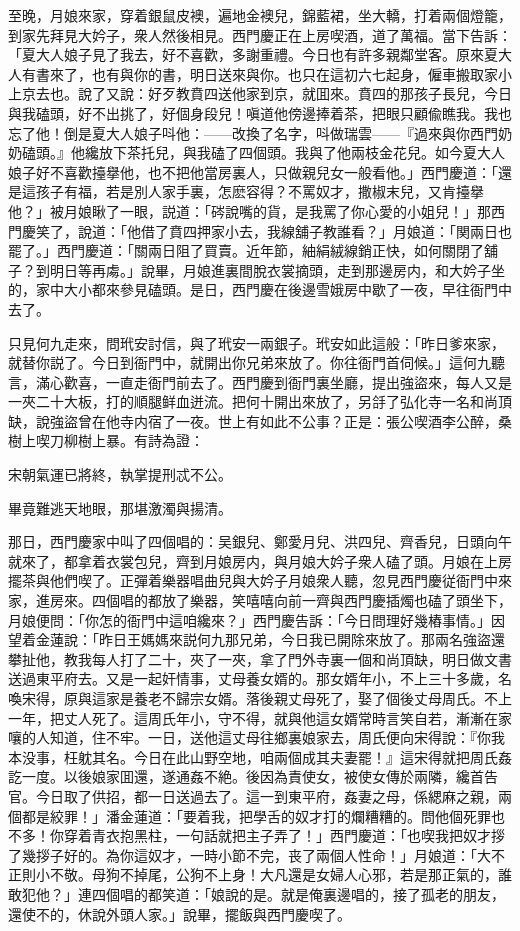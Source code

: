 至晚，月娘來家，穿着銀鼠皮襖，遍地金襖兒，錦藍裙，坐大轎，打着兩個燈籠，到家先拜見大妗子，衆人然後相見。西門慶正在上房喫酒，道了萬福。當下告訴：「夏大人娘子見了我去，好不喜歡，多謝重禮。今日也有許多親鄰堂客。原來夏大人有書來了，也有與你的書，明日送來與你。也只在這初六七起身，僱車搬取家小上京去也。說了又說：好歹教賁四送他家到京，就囬來。賁四的那孩子長兒，今日與我磕頭，好不出挑了，好個身段兒！嗔道他傍邊捧着茶，把眼只顧偸瞧我。我也忘了他！倒是夏大人娘子呌他：——改換了名字，呌做瑞雲——『過來與你西門奶奶磕頭。』他纔放下茶托兒，與我磕了四個頭。我與了他兩枝金花兒。如今夏大人娘子好不喜歡擡擧他，也不把他當房裏人，只做親兒女一般看他。」西門慶道：「還是這孩子有福，若是別人家手裏，怎麽容得？不罵奴才，撒椒末兒，又肯擡擧他？」被月娘瞅了一眼，説道：「硶說嘴的貨，是我罵了你心愛的小姐兒！」那西門慶笑了，說道：「他借了賁四押家小去，我線舖子教誰看？」月娘道：「関兩日也罷了。」西門慶道：「關兩日阻了買賣。近年節，紬絹絨線銷正快，如何關閉了舖子？到明日等再䖏。」說畢，月娘進裏間脫衣裳摘頭，走到那邊房内，和大妗子坐的，家中大小都來參見磕頭。是日，西門慶在後邊雪娥房中歇了一夜，早往衙門中去了。

只見何九走來，問玳安討信，與了玳安一兩銀子。玳安如此這般：「昨日爹來家，就替你説了。今日到衙門中，就開出你兄弟來放了。你往衙門首伺候。」這何九聽言，滿心歡喜，一直走衙門前去了。西門慶到衙門裏坐廳，提出強盜來，每人又是一夾二十大板，打的順腿鲜血迸流。把何十開出來放了，另㧱了弘化寺一名和尚頂缺，說強盜曾在他寺内宿了一夜。世上有如此不公事？正是：張公喫酒李公醉，桑樹上喫刀柳樹上暴。有詩為證：

\begin{myquote}
宋朝氣運已將終，執掌提刑忒不公。

畢竟難逃天地眼，那堪激濁與揚清。
\end{myquote}

那日，西門慶家中叫了四個唱的：吴銀兒、鄭愛月兒、洪四兒、齊香兒，日頭向午就來了，都拿着衣裳包兒，齊到月娘房内，與月娘大妗子衆人磕了頭。月娘在上房擺茶與他們喫了。正彈着樂器唱曲兒與大妗子月娘衆人聽，忽見西門慶従衙門中來家，進房來。四個唱的都放了樂器，笑嘻嘻向前一齊與西門慶插燭也磕了頭坐下，月娘便問：「你怎的衙門中這咱纔來？」西門慶告訴：「今日問理好幾樁事情。」因望着金蓮說：「昨日王媽媽來説何九那兄弟，今日我已開除來放了。那兩名強盜還攀扯他，教我每人打了二十，夾了一夾，拿了門外寺裏一個和尚頂缺，明日做文書送過東平府去。又是一起奸情事，丈母養女婿的。那女婿年小，不上三十多歲，名喚宋得，原與這家是養老不歸宗女婿。落後親丈母死了，娶了個後丈母周氏。不上一年，把丈人死了。這周氏年小，守不得，就與他這女婿常時言笑自若，漸漸在家嚷的人知道，住不牢。一日，送他這丈母往鄉裏娘家去，周氏便向宋得說：『你我本没事，枉躭其名。今日在此山野空地，咱兩個成其夫妻罷！』這宋得就把周氏姦訖一度。以後娘家囬還，遂通姦不絶。後因為責使女，被使女傳於兩隣，纔首告官。今日取了供招，都一日送過去了。這一到東平府，姦妻之母，係緦麻之親，兩個都是絞罪！」潘金蓮道：「要着我，把學舌的奴才打的爛糟糟的。問他個死罪也不多！你穿着青衣抱黑柱，一句話就把主子弄了！」西門慶道：「也喫我把奴才拶了幾拶子好的。為你這奴才，一時小節不完，丧了兩個人性命！」月娘道：「大不正則小不敬。母狗不掉尾，公狗不上身！大凡還是女婦人心邪，若是那正氣的，誰敢犯他？」連四個唱的都笑道：「娘說的是。就是俺裏邊唱的，接了孤老的朋友，還使不的，休說外頭人家。」說畢，擺飯與西門慶喫了。

